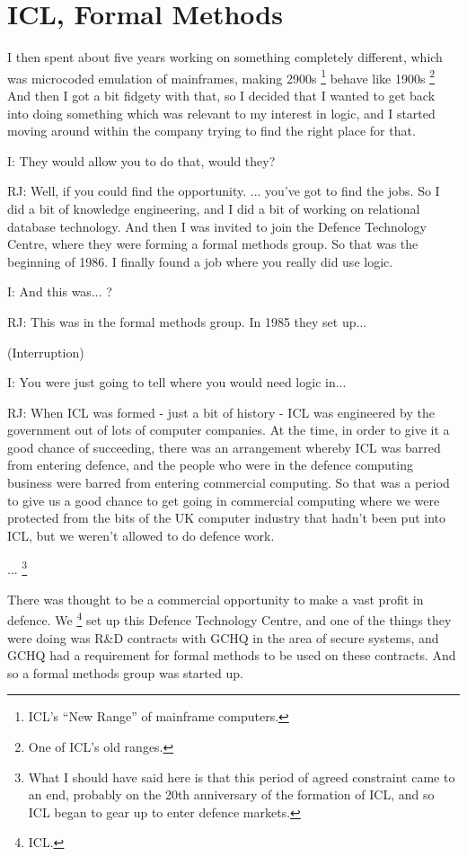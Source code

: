 \documentclass[10pt,titlepage]{book}
\begin{document}
\section{ICL, Formal Methods}

I then spent about five years working on something completely different, which was microcoded emulation of mainframes, making 2900s%
\footnote{
ICL's ``New Range'' of mainframe computers.
}
behave like 1900s%
\footnote{
One of ICL's old ranges.
}
And then I got a bit fidgety with that, so I decided that I wanted to get back into doing something which was relevant to my interest in logic, and I started moving around within the company trying to find the right place for that.

I: They would allow you to do that, would they?

RJ: Well, if you could find the opportunity.
... you've got to find the jobs.
So I did a bit of knowledge engineering, and I did a bit of working on relational database technology.
And then I was invited to join the Defence Technology Centre, where they were forming a formal methods group.
So that was the beginning of 1986. I finally found a job where you really did use logic.

I: And this was... ?

RJ: This was in the formal methods group. In 1985 they set up...

(Interruption)

I: You were just going to tell where you would need logic in...

RJ: 
When ICL was formed - just a bit of history - ICL was engineered by the government out of lots of computer companies.
At the time, in order to give it a good chance of succeeding, there was an arrangement whereby ICL was barred from entering defence, and the people who were in the defence computing business were barred from entering commercial computing.
So that was a period to give us a good chance to get going in commercial computing where we were protected from the bits of the UK computer industry that hadn't been put into ICL, but we weren't allowed to do defence work.

...%
\footnote{
What I should have said here is that this period of agreed constraint came to an end, probably on the 20th anniversary of the formation of ICL, and so ICL began to gear up to enter defence markets.
}

There was thought to be a commercial opportunity to make a vast profit in defence.
We%
\footnote{
ICL.
}%
 set up this Defence Technology Centre, and one of the things they were doing was R\&D contracts with GCHQ in the area of secure systems, and GCHQ had a requirement for formal methods to be used on these contracts.
And so a formal methods group was started up.
\end{document}
